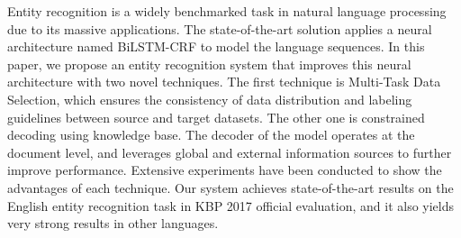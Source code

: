 Entity recognition is a widely benchmarked task in natural language processing due to its massive applications. The state-of-the-art solution applies a neural architecture named BiLSTM-CRF to model the language sequences. In this paper, we propose an entity recognition system that improves this neural architecture with two novel techniques. The first technique is Multi-Task Data Selection, which ensures the consistency of data distribution and labeling guidelines between source and target datasets. The other one is constrained decoding using knowledge base. The decoder of the model operates at the document level, and leverages global and external information sources to further improve performance. Extensive experiments have been conducted to show the advantages of each technique. Our system achieves state-of-the-art results on the English entity recognition task in KBP 2017 official evaluation, and it also yields very strong results in other languages.
